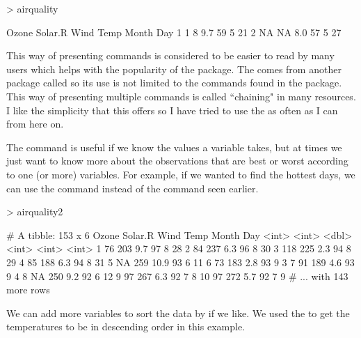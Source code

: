 \begin{Schunk}
\begin{Sinput}
> airquality %>% filter(Wind<10&Temp<60) 
\end{Sinput}
\begin{Soutput}
  Ozone Solar.R Wind Temp Month Day
1     1       8  9.7   59     5  21
2    NA      NA  8.0   57     5  27
\end{Soutput}
\end{Schunk}

This way of presenting commands is considered to be easier to read by many users which helps with the popularity of the   package. The  comes from another package called  so its use is not limited to the commands found in the  package.  
This way of presenting multiple commands is called ``chaining" in many resources. I like the simplicity that this offers so I have tried to use the  as often as I can from here on. 
  
The  command is useful if we know the values a variable takes, but at times we just want to know more about the observations that are best or worst according to one (or more) variables. For example, if we wanted to find the hottest days, we can use the  command instead of the  command seen earlier. 

\begin{Schunk}
\begin{Sinput}
> airquality2 %>% arrange(desc(Temp)) 
\end{Sinput}
\begin{Soutput}
# A tibble: 153 x 6
   Ozone Solar.R  Wind  Temp Month   Day
   <int>   <int> <dbl> <int> <int> <int>
 1    76     203   9.7    97     8    28
 2    84     237   6.3    96     8    30
 3   118     225   2.3    94     8    29
 4    85     188   6.3    94     8    31
 5    NA     259  10.9    93     6    11
 6    73     183   2.8    93     9     3
 7    91     189   4.6    93     9     4
 8    NA     250   9.2    92     6    12
 9    97     267   6.3    92     7     8
10    97     272   5.7    92     7     9
# ... with 143 more rows
\end{Soutput}
\end{Schunk}

We can add more variables to sort the data by if we like. We used the  to get the temperatures to be in descending order in this example. 
 
